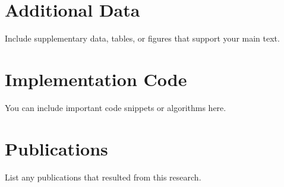 \documentclass[12pt, oneside]{book}
\theoremstyle{definition}
\theoremstyle{remark}
\begin{document}
\printbibliography[heading=bibintoc, title={References}]

\begin{appendices}

\chapter{Additional Data}
\label{app:data}

Include supplementary data, tables, or figures that support your main text.

\chapter{Implementation Code}
\label{app:code}

You can include important code snippets or algorithms here.

\chapter{Publications}
\label{app:publications}

List any publications that resulted from this research.

\end{appendices}
\end{document}
